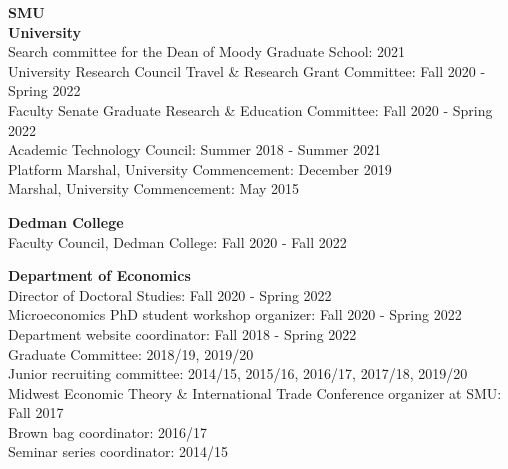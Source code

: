 \documentclass[11pt]{res}
\begin{document}
\begin{resume}
\textbf{SMU}\vspace{1.5mm}\\
\textbf{University}\vspace{1.5mm}\\
Search committee for the Dean of Moody Graduate School: 2021\vspace{1.5mm}\\
University Research Council Travel \& Research Grant Committee: Fall 2020 - Spring 2022\vspace{1.5mm}\\
Faculty Senate Graduate Research \& Education Committee: Fall 2020 - Spring 2022\vspace{1.5mm}\\
Academic Technology Council: Summer 2018 - Summer 2021\vspace{1.5mm}\\
Platform Marshal, University Commencement: December 2019\vspace{1.5mm}\\
Marshal, University Commencement: May 2015

\textbf{Dedman College}\vspace{1.5mm}\\
Faculty Council, Dedman College: Fall 2020 - Fall 2022

\textbf{Department of Economics}\vspace{1.5mm}\\
Director of Doctoral Studies: Fall 2020 - Spring 2022\vspace{1.5mm}\\
Microeconomics PhD student workshop organizer: Fall 2020 - Spring 2022\vspace{1.5mm}\\
Department website coordinator: Fall 2018 - Spring 2022\vspace{1.5mm}\\
Graduate Committee: 2018/19, 2019/20\vspace{1.5mm}\\
Junior recruiting committee: 2014/15, 2015/16, 2016/17, 2017/18, 2019/20\vspace{1.5mm}\\
Midwest Economic Theory \& International Trade Conference organizer at SMU: Fall 2017\vspace{1.5mm}\\
Brown bag coordinator: 2016/17\vspace{1.5mm}\\
Seminar series coordinator: 2014/15

\end{resume}
\end{document}
